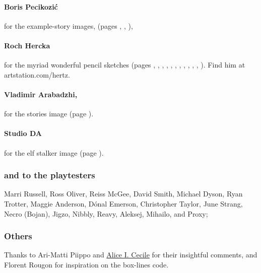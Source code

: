 \begin{multicols}{2}
\paragraph{Boris Pecikozi\'c} for the example-story images, (pages 
\pageref{Boris_Pecikozic/nura_jump}, 
\pageref{Boris_Pecikozic/nura_brawl}, 
\pageref{Boris_Pecikozic/dwarves_meet}), 

\paragraph{Roch Hercka} for the myriad wonderful pencil sketches (pages 
\pageref{Roch_Hercka/five_races}, 
\pageref{Roch_Hercka/dwarf_encumbrance}, 
\pageref{Roch_Hercka/stances}, 
\pageref{Roch_Hercka/vitals_shot}, 
\pageref{Roch_Hercka/xp-1}, 
\pageref{Roch_Hercka/xp-2}, 
\pageref{Roch_Hercka/elvish_enchanter}, 
\pageref{Roch_Hercka/conjuration_left}, 
\pageref{Roch_Hercka/polymorph}, 
\pageref{Roch_Hercka/dwarvish_runes}, 
\pageref{Roch_Hercka/illusion_trogdor}, 
\pageref{Roch_Hercka/flashing_light}
).
Find him at artstation.com/hertz.


\paragraph{Vladimir Arabadzhi,}
for the stories image (page \pageref{Vladimir_Arabadzhi/escape}).

\paragraph{Studio DA}
for the elf stalker image
(page \pageref{Studio_DA/elf_stalker}).

\subsubsection*{and to the playtesters} Marri Russell, Ross Oliver, Reiss McGee, David Smith, Michael Dyson, Ryan Trotter, Maggie Anderson, 
D\'{o}nal Emerson, Christopher Taylor, June Strang, 
Necro (Bojan), Jigzo, Nibbly, Reavy, 
Aleksej, Mihailo, and Proxy;

\subsubsection*{Others}
Thanks to Ari-Matti Piippo and \href{https://www.twitter.com/AliceICecile}{Alice I. Cecile} for their insightful comments,
and Florent Rougon for inspiration on the box-lines code.

\end{multicols}

